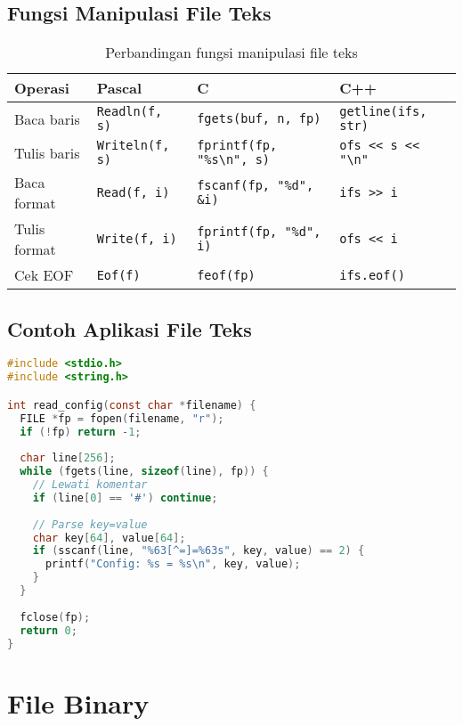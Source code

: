 \documentclass[../main.tex]{subfiles}
\begin{document}
\subsection{Fungsi Manipulasi File Teks}

\begin{table}[H]
\centering
\begin{tabular}{|l|l|l|l|}
\hline
\textbf{Operasi} & \textbf{Pascal} & \textbf{C} & \textbf{C++} \\ \hline
Baca baris & \texttt{Readln(f, s)} & \texttt{fgets(buf, n, fp)} & \texttt{getline(ifs, str)} \\ \hline
Tulis baris & \texttt{Writeln(f, s)} & \texttt{fprintf(fp, "\%s\textbackslash n", s)} & \texttt{ofs << s << "\textbackslash n"} \\ \hline
Baca format & \texttt{Read(f, i)} & \texttt{fscanf(fp, "\%d", \&i)} & \texttt{ifs >> i} \\ \hline
Tulis format & \texttt{Write(f, i)} & \texttt{fprintf(fp, "\%d", i)} & \texttt{ofs << i} \\ \hline
Cek EOF & \texttt{Eof(f)} & \texttt{feof(fp)} & \texttt{ifs.eof()} \\ \hline
\end{tabular}
\caption{Perbandingan fungsi manipulasi file teks}
\end{table}

\subsection{Contoh Aplikasi File Teks}

\begin{lstlisting}[language=C, caption={Membaca file konfigurasi sederhana}]
#include <stdio.h>
#include <string.h>

int read_config(const char *filename) {
  FILE *fp = fopen(filename, "r");
  if (!fp) return -1;
  
  char line[256];
  while (fgets(line, sizeof(line), fp)) {
    // Lewati komentar
    if (line[0] == '#') continue;
    
    // Parse key=value
    char key[64], value[64];
    if (sscanf(line, "%63[^=]=%63s", key, value) == 2) {
      printf("Config: %s = %s\n", key, value);
    }
  }
  
  fclose(fp);
  return 0;
}
\end{lstlisting}

\section{File Binary}
\end{document}
